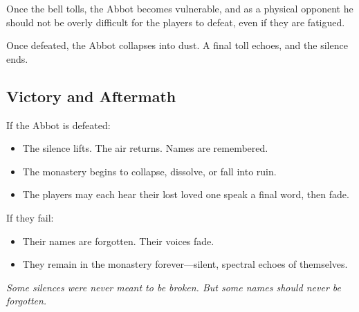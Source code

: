 Once the bell tolls, the Abbot becomes vulnerable, and as a physical opponent he should not be overly difficult for the players to defeat, even if they are fatigued. 

Once defeated, the Abbot collapses into dust. A final toll echoes, and the silence ends.



\subsection*{Victory and Aftermath}

If the Abbot is defeated:
    \begin{itemize}
    \item The silence lifts. The air returns. Names are remembered.
    \item The monastery begins to collapse, dissolve, or fall into ruin.
    \item The players may each hear their lost loved one speak a final word, then fade.
    \end{itemize}

If they fail:
    \begin{itemize}
    \item Their names are forgotten. Their voices fade.
    \item They remain in the monastery forever—silent, spectral echoes of themselves.
    \end{itemize}

\vspace{\baselineskip}\noindent
\emph{Some silences were never meant to be broken. But some names should never be forgotten.}



